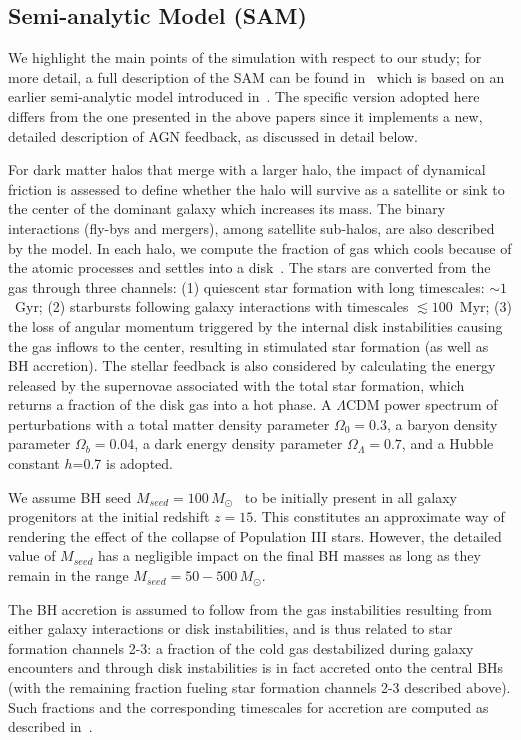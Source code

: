 \documentclass[twocolumn]{aastex631}
\begin{document}
\subsection{Semi-analytic Model (SAM)}\label{subsec:SAM}
We highlight the main points of the simulation with respect to our study; for more detail, a full description of the SAM can be found in~\citet{Menci2016} which is based on an earlier semi-analytic model introduced in~\citet{Menci2014}. The specific version adopted here differs from the one presented in the above papers since it implements a new, detailed description of AGN feedback, as discussed in detail below.

For dark matter halos that merge with a larger halo, the impact of dynamical friction is assessed to define whether the halo will survive as a satellite or sink to the center of the dominant galaxy which increases its mass. The binary interactions (fly-bys and mergers), among satellite sub-halos, are  also described by the model. In each halo, we compute the fraction of gas which cools because of the atomic processes and settles into a disk~\citep{Mo1998}. The stars are converted from the gas through three channels: (1) quiescent star formation with long timescales: $\sim1$~Gyr; (2) starbursts following galaxy interactions with timescales $\lesssim 100$~Myr;  (3) the loss of angular momentum triggered by the internal disk instabilities causing the gas inflows to the center, resulting in stimulated star formation (as well as BH accretion). The stellar feedback is also considered by calculating the energy released by the supernovae associated with the total star formation, which returns a fraction of the disk gas into a hot phase. 
A $\Lambda$CDM power spectrum of perturbations with a total matter density parameter $\Omega_0=0.3$, a baryon density parameter 
$\Omega_b=0.04$, a dark energy density parameter $\Omega_\Lambda=0.7$, and a Hubble constant $h$=0.7 is adopted.

{We assume BH seed $M_{seed}=100\,M_{\odot}$~\citep{Madau2001}  to be initially present in all galaxy progenitors at the initial redshift $z=15$. This constitutes an approximate way of rendering the effect of the collapse of Population III stars. However, the detailed value of $M_{seed}$ has a negligible impact on the final BH masses as long as they remain in the range $M_{seed}=50-500\,M_{\odot}$.
}

The BH accretion is assumed to follow from the gas instabilities resulting from either galaxy interactions or disk instabilities, and is thus related to star formation channels 2-3: a fraction of the cold gas destabilized during galaxy encounters and through disk instabilities is in fact accreted onto the central BHs (with the remaining fraction fueling star formation channels 2-3 described above). Such fractions and the corresponding timescales for accretion are computed as described in~\citet[][their Section 3]{Menci2014}.
\end{document}
